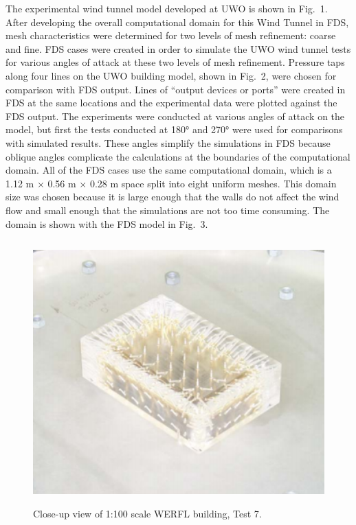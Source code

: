 The experimental wind tunnel model developed at UWO is shown in Fig.~1. After developing the overall computational domain for this Wind Tunnel in FDS, mesh characteristics were determined for two levels of mesh refinement: coarse and fine. FDS cases were created in order to simulate the UWO wind tunnel tests for various angles of attack at these two levels of mesh refinement. Pressure taps along four lines on the UWO building model, shown in Fig.~2, were chosen for comparison with FDS output. Lines of ``output devices or ports'' were created in FDS at the same locations and the experimental data were plotted against the FDS output. The experiments were conducted at various angles of attack on the model, but first the tests conducted at 180\si{\degree} and 270\si{\degree} were used for comparisons with simulated results. These angles simplify the simulations in FDS because oblique angles complicate the calculations at the boundaries of the computational domain. All of the FDS cases use the same computational domain, which is a 1.12 m $\times$ 0.56 m $\times$ 0.28 m space split into eight uniform meshes. This domain size was chosen because it is large enough that the walls do not affect the wind flow and small enough that the simulations are not too time consuming. The domain is shown with the FDS model in Fig.~3.

\begin{figure}
\begin{center}
\includegraphics[height=4in]{FIGURES/Wind_Engineering/UWO_Test_7_closeup.png}
\caption[Close-up view of 1:100 scale WERFL building, Test 7]{Close-up view of 1:100 scale WERFL building, Test 7.}
\label{UWO_Test_7_closeup}
\end{center}
\end{figure}

